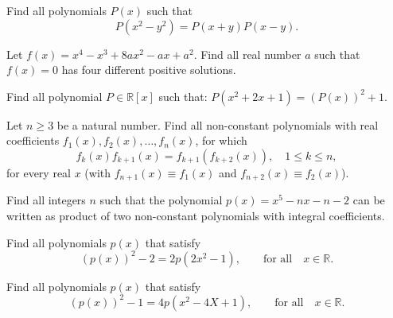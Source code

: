 \documentclass[12pt,a4paper]{memoir}
\theoremstyle{definition}
\begin{document}
\begin{question}
	Find all polynomials $ P(x)$ such that
	\[P(x^2-y^2)=P(x+y)P(x-y).\]
\end{question}





\begin{question}
	Let $f(x)=x^4-x^3+8ax^2-ax+a^2$. Find all real number $ a$ such that $f(x)=0$ has four different positive solutions.
\end{question}




\begin{question}
	Find all polynomial $ P\in \mathbb {R}[x]$ such that: $P(x^2+2x+1)=(P(x))^2+1$.
\end{question}





\begin{question}
	Let $ n\ge 3$ be a natural number. Find all non-constant polynomials with real coefficients $ f_{1}\left(x\right),f_{2}\left(x\right),\dots,f_{n}\left(x\right)$, for which
	\[ f_{k}\left(x\right)f_{k+ 1}\left(x\right) = f_{k +1}\left(f_{k + 2}\left(x\right)\right), \quad  1\le k\le n,\]
	for every real $ x$ (with $ f_{n +1}\left(x\right)\equiv f_{1}\left(x\right)$ and $ f_{n + 2}\left(x\right)\equiv f_{2}\left(x\right)$).
\end{question}





\begin{question}
	Find all integers $n$ such that the polynomial $p(x)=x^5-nx-n-2$ can be written as product  of two non-constant polynomials with integral coefficients.
\end{question}




\begin{question}
	Find all polynomials $p(x)$ that satisfy 
	\[(p(x))^2-2=2p(2x^2-1), \qquad \text{for all} \quad x \in \mathbb R.\]
\end{question}




\begin{question}
	Find all polynomials $p(x)$ that satisfy
	\[(p(x))^2-1=4p(x^2-4X+1), \qquad \text{for all} \quad  x \in \mathbb R.\]
\end{question}


	
\end{document}
